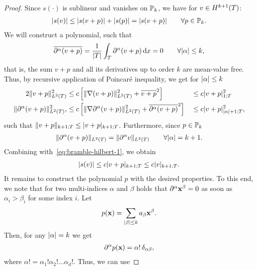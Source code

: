 \begin{proof}
  Since $s(\cdot)$ is sublinear and vanishes on $\P_k$, we have for
  $v\in H^{k+1}(\cell)$:
  \begin{gather}
    \label{eq:bramble-hilbert-1}
    \abs{s(v)} \le \abs{s(v+p)} + \abs{s(p)} = \abs{s(v+p)}
    \qquad\forall p\in\P_k.
  \end{gather}
  We will construct a polynomial, such that
  \begin{gather}
    \label{eq:bramble-hilbert-2}
    \overline{\d^\alpha(v+p)}
    = \frac1{\abs{\cell}}\int_\cell \d^\alpha (v+p) \dx = 0
    \qquad\forall \abs{\alpha} \le k,
  \end{gather}
  that is, the sum $v+p$ and all its derivatives up to order $k$ are
  mean-value free. Thus, by recursive application of Poincaré
  inequality, we get for $\abs{\alpha}\le k$
  \begin{alignat*}2
    \norm{v+p}_{L^2(\cell)}^2
    &\le c \left[ \norm{\nabla(v+p)}_{L^2(\cell)}^2 + \overline{v+p}^2\right]
      && \le c \snorm{v+p}_{1;\cell}^2\\
    \norm{\d^\alpha(v+p)}_{L^2(\cell)}^2,
    &\le c \left[ \norm{\nabla\d^\alpha(v+p)}_{L^2(\cell)}^2
      + \overline{\d^\alpha(v+p)}^2\right]
      && \le c \snorm{v+p}_{\abs{\alpha}+1;\cell}^2,
  \end{alignat*}
  such that $\norm{v+p}_{k+1;\cell} \le \snorm{v+p}_{k+1;\cell}$.
  Furthermore, since $p\in\P_k$
  \begin{gather*}
    \norm{\d^\alpha(v+p)}_{L^2(\cell)} = \norm{\d^\alpha v}_{L^2(\cell)}
    \qquad\forall \abs{\alpha} = k+1.
  \end{gather*}
  Combining with~\eqref{eq:bramble-hilbert-1}, we obtain
  \begin{gather*}
    \abs{s(v)} \le c \snorm{v+p}_{k+1;\cell} \le c \snorm{v}_{k+1;\cell}.
  \end{gather*}
  It remains to construct the polynomial $p$ with the desired
  properties. To this end, we note that for two multi-indices $\alpha$
  and $\beta$ holds that $\d^\alpha \vx^\beta =0$ as soon as
  $\alpha_i>\beta_i$ for some index $i$. Let
  \begin{gather*}
    p(\vx) = \sum_{\abs{\beta}\le k} a_\beta \vx^\beta.
  \end{gather*}
  Then, for any $\abs{\alpha} = k$ we get
  \begin{gather*}
    \d^\alpha p(\vx) = \alpha! \,\delta_{\alpha\beta},
  \end{gather*}
  where $\alpha! = \alpha_1!\alpha_2!\dots\alpha_d!$. Thus, we can use

\end{proof}
